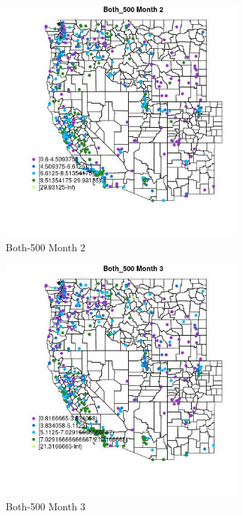 \clearpage 

\begin{figure} 
\centering  
\includegraphics[width=0.77\textwidth]{Code_Outputs/ML_input_report_ML_input_PM25_Step5_part_d_de_duplicated_aves_ML_input_MapObsMo2Both_500.jpg} 
\caption{\label{fig:ML_input_report_ML_input_PM25_Step5_part_d_de_duplicated_aves_ML_inputMapObsMo2Both_500}Both-500 Month 2} 
\end{figure} 
 

\begin{figure} 
\centering  
\includegraphics[width=0.77\textwidth]{Code_Outputs/ML_input_report_ML_input_PM25_Step5_part_d_de_duplicated_aves_ML_input_MapObsMo3Both_500.jpg} 
\caption{\label{fig:ML_input_report_ML_input_PM25_Step5_part_d_de_duplicated_aves_ML_inputMapObsMo3Both_500}Both-500 Month 3} 
\end{figure} 
 


